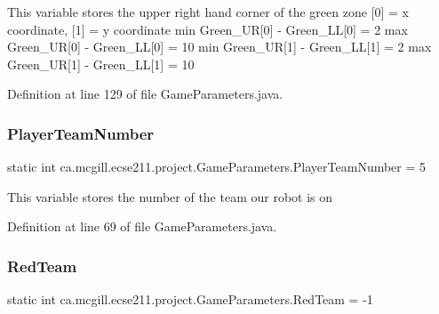 This variable stores the upper right hand corner of the green zone \mbox{[}0\mbox{]} = x coordinate, \mbox{[}1\mbox{]} = y coordinate min Green\+\_\+\+UR\mbox{[}0\mbox{]} -\/ Green\+\_\+\+LL\mbox{[}0\mbox{]} = 2 max Green\+\_\+\+UR\mbox{[}0\mbox{]} -\/ Green\+\_\+\+LL\mbox{[}0\mbox{]} = 10 min Green\+\_\+\+UR\mbox{[}1\mbox{]} -\/ Green\+\_\+\+LL\mbox{[}1\mbox{]} = 2 max Green\+\_\+\+UR\mbox{[}1\mbox{]} -\/ Green\+\_\+\+LL\mbox{[}1\mbox{]} = 10 

Definition at line 129 of file Game\+Parameters.\+java.

\mbox{\label{enumca_1_1mcgill_1_1ecse211_1_1project_1_1_game_parameters_aa3fb61a4aa9d34ab4dd029eccb6e056c}} 
\subsubsection{\texorpdfstring{Player\+Team\+Number}{PlayerTeamNumber}}
{\footnotesize\ttfamily  static  int ca.\+mcgill.\+ecse211.\+project.\+Game\+Parameters.\+Player\+Team\+Number = 5\hspace{0.3cm}{\ttfamily [static]}}

This variable stores the number of the team our robot is on 

Definition at line 69 of file Game\+Parameters.\+java.

\mbox{\label{enumca_1_1mcgill_1_1ecse211_1_1project_1_1_game_parameters_ad36fe5629718c944df7317e53145850c}} 
\subsubsection{\texorpdfstring{Red\+Team}{RedTeam}}
{\footnotesize\ttfamily  static  int ca.\+mcgill.\+ecse211.\+project.\+Game\+Parameters.\+Red\+Team = -\/1\hspace{0.3cm}{\ttfamily [static]}}

